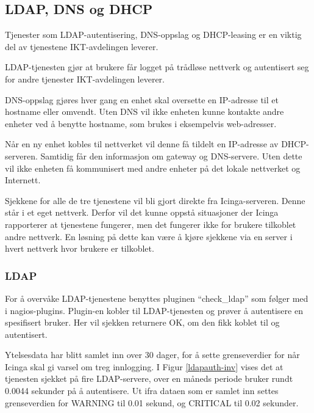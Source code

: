 \subsection{LDAP, DNS og DHCP}
Tjenester som LDAP-autentisering, DNS-oppslag og DHCP-leasing er en viktig del av tjenestene IKT-avdelingen leverer.

LDAP-tjenesten\cite{ldap} gjør at brukere får logget på trådløse nettverk og autentisert seg for andre tjenester IKT-avdelingen leverer.

DNS-oppslag gjøres hver gang en enhet skal oversette en IP-adresse til et hostname eller omvendt. Uten DNS vil ikke enheten kunne kontakte andre enheter ved å benytte hostname, som brukes i eksempelvis web-adresser\cite{dns}. 

Når en ny enhet kobles til nettverket vil denne få tildelt en IP-adresse av DHCP-serveren. Samtidig får den informasjon om gateway og DNS-servere. Uten dette vil ikke enheten få kommunisert med andre enheter på det lokale nettverket og Internett\cite{dhcp}.

Sjekkene for alle de tre tjenestene vil bli gjort direkte fra Icinga-serveren. Denne står i et eget nettverk. Derfor vil det kunne oppstå situasjoner der Icinga rapporterer at tjenestene fungerer, men det fungerer ikke for brukere tilkoblet andre nettverk. En løsning på dette kan være å kjøre sjekkene via en server i hvert nettverk hvor brukere er tilkoblet.

\subsubsection*{LDAP}
For å overvåke LDAP-tjenestene benyttes pluginen ``check\_ldap'' som følger med i nagios-plugins. Plugin-en kobler til LDAP-tjenesten og prøver å autentisere en spesifisert bruker. Her vil sjekken returnere OK, om den fikk koblet til og autentisert. 

Ytelsesdata har blitt samlet inn over 30 dager, for å sette grenseverdier for når Icinga skal gi varsel om treg innlogging. I Figur \ref{ldapauth-inv} vises det at tjenesten sjekket på fire LDAP-servere, over en måneds periode bruker rundt 0.0044 sekunder på å autentisere. Ut ifra dataen som er samlet inn settes grenseverdien for WARNING til 0.01 sekund, og CRITICAL til 0.02 sekunder.

